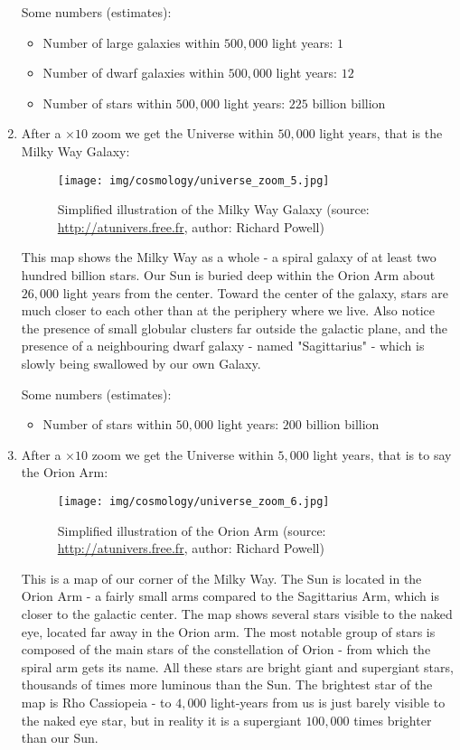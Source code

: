 \begin{enumerate}
		Some numbers (estimates):
		\begin{itemize}
			\item Number of large galaxies within $500,000$ light years: $1$
			\item Number of dwarf galaxies within $500,000$ light years: $12$
			\item Number of stars within $500,000$ light years: $225$ billion billion
		\end{itemize}
		
		\item After a $\times 10$ zoom we get the Universe within $50,000$ light years, that is the Milky Way Galaxy:
		\begin{figure}[H]
			\centering
			\texttt{[image: img/cosmology/universe\_zoom\_5.jpg]}
			\caption[Simplified illustration of the Milky Way Galaxy]{Simplified illustration of the Milky Way Galaxy (source: \url{http://atunivers.free.fr}, author: Richard Powell)}
		\end{figure}
		This map shows the Milky Way as a whole - a spiral galaxy of at least two hundred billion stars. Our Sun is buried deep within the Orion Arm about $26,000$ light years from the center. Toward the center of the galaxy, stars are much closer to each other than at the periphery where we live. Also notice the presence of small globular clusters far outside the galactic plane, and the presence of a neighbouring dwarf galaxy - named "Sagittarius" - which is slowly being swallowed by our own Galaxy.
		
		Some numbers (estimates):
		\begin{itemize}
			\item Number of stars within $50,000$ light years: $200$ billion billion
		\end{itemize}
		
		\item After a $\times 10$ zoom we get the Universe within $5,000$ light years, that is to say the Orion Arm:
		\begin{figure}[H]
			\centering
			\texttt{[image: img/cosmology/universe\_zoom\_6.jpg]}
			\caption[Simplified illustration of the Orion Arm]{Simplified illustration of the Orion Arm (source: \url{http://atunivers.free.fr}, author: Richard Powell)}
		\end{figure}
		This is a map of our corner of the Milky Way. The Sun is located in the Orion Arm - a fairly small arms compared to the Sagittarius Arm, which is closer to the galactic center. The map shows several stars visible to the naked eye, located far away in the Orion arm. The most notable group of stars is composed of the main stars of the constellation of Orion - from which the spiral arm gets its name. All these stars are bright giant and supergiant stars, thousands of times more luminous than the Sun. The brightest star of the map is Rho Cassiopeia - to $4,000$ light-years from us is just barely visible to the naked eye star, but in reality it is a supergiant $100,000$ times brighter than our Sun.
		

\end{enumerate}
